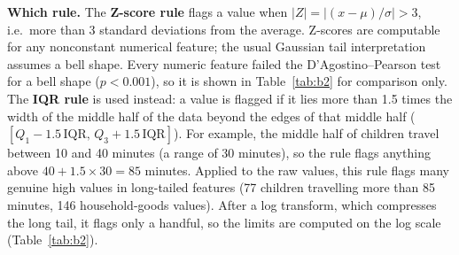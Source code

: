 \documentclass[conference,a4paper]{IEEEtran}
\begin{document}
\textbf{Which rule.} The \textbf{Z-score rule} flags a value when $|Z| = |(x-\mu)/\sigma| > 3$, i.e.\ more than 3 standard deviations from the average. Z-scores are computable for any nonconstant numerical feature; the usual Gaussian tail interpretation assumes a bell shape. Every numeric feature failed the D'Agostino--Pearson test for a bell shape ($p<0.001$), so it is shown in Table~\ref{tab:b2} for comparison only. The \textbf{IQR rule} \cite{tukey} is used instead: a value is flagged if it lies more than 1.5 times the width of the middle half of the data beyond the edges of that middle half ($[Q_1-1.5\,\text{IQR},\,Q_3+1.5\,\text{IQR}]$). For example, the middle half of children travel between 10 and 40 minutes (a range of 30 minutes), so the rule flags anything above $40+1.5\times30=85$ minutes. Applied to the raw values, this rule flags many genuine high values in long-tailed features (77 children travelling more than 85 minutes, 146 household-goods values). After a log transform, which compresses the long tail, it flags only a handful, so the limits are computed on the log scale (Table~\ref{tab:b2}).
\end{document}

